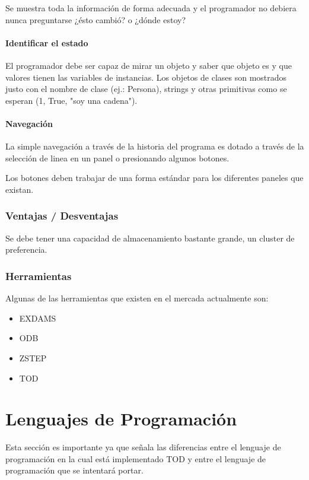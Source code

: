 \documentclass[12pt,a4paper]{report}
\begin{document}
Se muestra toda la información de forma adecuada y el programador no debiera nunca preguntarse ¿ésto cambió? o ¿dónde estoy?

				\paragraph{Identificar el estado}

El programador debe ser capaz de mirar un objeto y saber que objeto es y que valores tienen las variables de instancias.  Los objetos de clases son mostrados justo con el nombre de clase (ej.: Persona), strings y otras primitivas como se esperan (1, True, "soy una cadena").

				\paragraph{Navegación}

La simple navegación a través de la historia del programa es dotado a través de la selección de linea en un panel o presionando algunos botones.

Los botones deben trabajar de una forma estándar para los diferentes paneles que existan.


			\subsubsection{Ventajas / Desventajas}

Se debe tener una capacidad de almacenamiento bastante grande, un cluster de preferencia.

			\subsubsection{Herramientas}

Algunas de las herramientas que existen en el mercada actualmente son:
\begin{itemize}
	\item EXDAMS
	\item ODB
	\item ZSTEP
	\item TOD
\end{itemize}

	\section{Lenguajes de Programación}

Esta sección es importante ya que señala las diferencias entre el lenguaje de programación en la cual está implementado TOD y entre el lenguaje de programación que se intentará portar.
\end{document}

